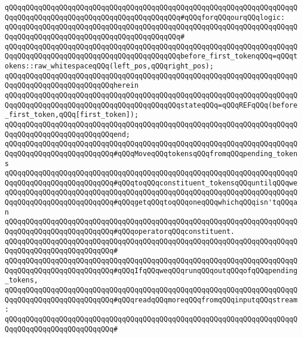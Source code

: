 \verb|qQQqqQQqqQQqqQQqqQQqqQQqqQQqqQQqqQQqqQQqqQQqqQQqqQQqqQQqqQQqqQQqqQQqqQQqqQQqqQQqqQQqqQQqqQQqqQQqqQQqqQQqqQQqqQQq#qQQqforqQQqourqQQqlogic:|\newline
\verb|qQQqqQQqqQQqqQQqqQQqqQQqqQQqqQQqqQQqqQQqqQQqqQQqqQQqqQQqqQQqqQQqqQQqqQQqqQQqqQQqqQQqqQQqqQQqqQQqqQQqqQQqqQQqqQQq#|\newline
\verb|qQQqqQQqqQQqqQQqqQQqqQQqqQQqqQQqqQQqqQQqqQQqqQQqqQQqqQQqqQQqqQQqqQQqqQQqqQQqqQQqqQQqqQQqqQQqqQQqqQQqqQQqqQQqqQQqbefore_first_tokenqQQq=qQQqtokens::raw_whitespaceqQQq(left_pos,qQQqright_pos);|\newline
\verb|qQQqqQQqqQQqqQQqqQQqqQQqqQQqqQQqqQQqqQQqqQQqqQQqqQQqqQQqqQQqqQQqqQQqqQQqqQQqqQQqqQQqqQQqqQQqqQQqherein|\newline
\verb|qQQqqQQqqQQqqQQqqQQqqQQqqQQqqQQqqQQqqQQqqQQqqQQqqQQqqQQqqQQqqQQqqQQqqQQqqQQqqQQqqQQqqQQqqQQqqQQqqQQqqQQqqQQqqQQqstateqQQq=qQQqREFqQQq(before_first_token,qQQq[first_token]);|\newline
\verb|qQQqqQQqqQQqqQQqqQQqqQQqqQQqqQQqqQQqqQQqqQQqqQQqqQQqqQQqqQQqqQQqqQQqqQQqqQQqqQQqqQQqqQQqqQQqqQQqend;|\newline
\newline
\verb|qQQqqQQqqQQqqQQqqQQqqQQqqQQqqQQqqQQqqQQqqQQqqQQqqQQqqQQqqQQqqQQqqQQqqQQqqQQqqQQqqQQqqQQqqQQqqQQq#qQQqMoveqQQqtokensqQQqfromqQQqpending_tokens|\newline
\verb|qQQqqQQqqQQqqQQqqQQqqQQqqQQqqQQqqQQqqQQqqQQqqQQqqQQqqQQqqQQqqQQqqQQqqQQqqQQqqQQqqQQqqQQqqQQqqQQq#qQQqtoqQQqconstituent_tokensqQQquntilqQQqwe|\newline
\verb|qQQqqQQqqQQqqQQqqQQqqQQqqQQqqQQqqQQqqQQqqQQqqQQqqQQqqQQqqQQqqQQqqQQqqQQqqQQqqQQqqQQqqQQqqQQqqQQq#qQQqgetqQQqtoqQQqoneqQQqwhichqQQqisn'tqQQqan|\newline
\verb|qQQqqQQqqQQqqQQqqQQqqQQqqQQqqQQqqQQqqQQqqQQqqQQqqQQqqQQqqQQqqQQqqQQqqQQqqQQqqQQqqQQqqQQqqQQqqQQq#qQQqoperatorqQQqconstituent.|\newline
\verb|qQQqqQQqqQQqqQQqqQQqqQQqqQQqqQQqqQQqqQQqqQQqqQQqqQQqqQQqqQQqqQQqqQQqqQQqqQQqqQQqqQQqqQQqqQQqqQQq#|\newline
\verb|qQQqqQQqqQQqqQQqqQQqqQQqqQQqqQQqqQQqqQQqqQQqqQQqqQQqqQQqqQQqqQQqqQQqqQQqqQQqqQQqqQQqqQQqqQQqqQQq#qQQqIfqQQqweqQQqrunqQQqoutqQQqofqQQqpending_tokens,|\newline
\verb|qQQqqQQqqQQqqQQqqQQqqQQqqQQqqQQqqQQqqQQqqQQqqQQqqQQqqQQqqQQqqQQqqQQqqQQqqQQqqQQqqQQqqQQqqQQqqQQq#qQQqreadqQQqmoreqQQqfromqQQqinputqQQqstream:|\newline
\verb|qQQqqQQqqQQqqQQqqQQqqQQqqQQqqQQqqQQqqQQqqQQqqQQqqQQqqQQqqQQqqQQqqQQqqQQqqQQqqQQqqQQqqQQqqQQqqQQq#|\newline
